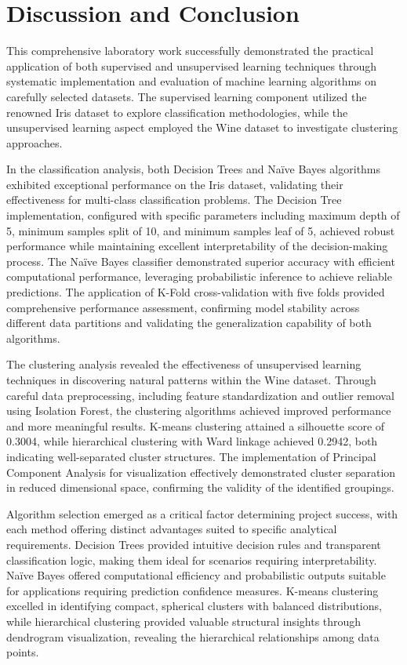 \documentclass[12pt,a4paper]{article}
\begin{document}
\section{Discussion and Conclusion}

This comprehensive laboratory work successfully demonstrated the practical application of both supervised and unsupervised learning techniques through systematic implementation and evaluation of machine learning algorithms on carefully selected datasets. The supervised learning component utilized the renowned Iris dataset to explore classification methodologies, while the unsupervised learning aspect employed the Wine dataset to investigate clustering approaches.

In the classification analysis, both Decision Trees and Na\"{i}ve Bayes algorithms exhibited exceptional performance on the Iris dataset, validating their effectiveness for multi-class classification problems. The Decision Tree implementation, configured with specific parameters including maximum depth of 5, minimum samples split of 10, and minimum samples leaf of 5, achieved robust performance while maintaining excellent interpretability of the decision-making process. The Na\"{i}ve Bayes classifier demonstrated superior accuracy with efficient computational performance, leveraging probabilistic inference to achieve reliable predictions. The application of K-Fold cross-validation with five folds provided comprehensive performance assessment, confirming model stability across different data partitions and validating the generalization capability of both algorithms.

The clustering analysis revealed the effectiveness of unsupervised learning techniques in discovering natural patterns within the Wine dataset. Through careful data preprocessing, including feature standardization and outlier removal using Isolation Forest, the clustering algorithms achieved improved performance and more meaningful results. K-means clustering attained a silhouette score of 0.3004, while hierarchical clustering with Ward linkage achieved 0.2942, both indicating well-separated cluster structures. The implementation of Principal Component Analysis for visualization effectively demonstrated cluster separation in reduced dimensional space, confirming the validity of the identified groupings.

Algorithm selection emerged as a critical factor determining project success, with each method offering distinct advantages suited to specific analytical requirements. Decision Trees provided intuitive decision rules and transparent classification logic, making them ideal for scenarios requiring interpretability. Na\"{i}ve Bayes offered computational efficiency and probabilistic outputs suitable for applications requiring prediction confidence measures. K-means clustering excelled in identifying compact, spherical clusters with balanced distributions, while hierarchical clustering provided valuable structural insights through dendrogram visualization, revealing the hierarchical relationships among data points.
\end{document}
